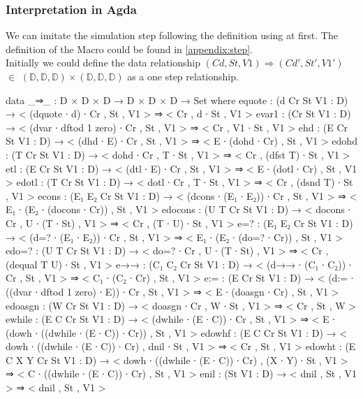 \subsubsection{Interpretation in Agda}\label{definition: agda simulation}
We can imitate the simulation step following the definition using \Agda at first.
The definition of the  Macro could be found in \ref{appendix:step}.\\
Initially we could define the data relationship $(Cd,St,V1)\Rightarrow(Cd',St',V1')$ $\in$  $(\mathds{D},\mathds{D},\mathds{D})\times (\mathds{D},\mathds{D},\mathds{D})$ as a one step relationship.
\begin{code}[fontsize=\scriptsize]
data _⇒_ : D × D × D → D × D × D → Set where
  equote  : (d Cr St V1 : D)
            → < (dquote ∙ d) ∙ Cr , St , V1 >
            ⇒ < Cr , d ∙ St , V1 >
  evar1   : (Cr St V1 : D)
            → < (dvar ∙ dftod {1} zero) ∙ Cr , St , V1 >
            ⇒ < Cr , V1 ∙ St , V1 >
  ehd     : (E Cr St V1 : D)
            → < (dhd ∙ E) ∙ Cr , St , V1 >
            ⇒ < E ∙ (dohd ∙ Cr) , St , V1 >
  edohd   : (T Cr St V1 : D)
            → < dohd ∙ Cr , T ∙ St , V1 >
            ⇒ < Cr , (dfst T) ∙ St , V1 >
  etl     : (E Cr St V1 : D)
            → < (dtl ∙ E) ∙ Cr , St , V1 >
            ⇒ < E ∙ (dotl ∙ Cr) , St , V1 >
  edotl   : (T Cr St V1 : D)
            → < dotl ∙ Cr , T ∙ St , V1 >
            ⇒ < Cr , (dsnd T) ∙ St , V1 >
  econs   : (E₁ E₂ Cr St V1 : D)
            → < (dcons ∙ (E₁ ∙ E₂)) ∙ Cr , St , V1 >
            ⇒ < E₁ ∙ (E₂ ∙ (docons ∙ Cr)) , St , V1 >
  edocons : (U T Cr St V1 : D)
            → < docons ∙ Cr , U ∙ (T ∙ St) , V1 >
            ⇒ < Cr , (T ∙ U) ∙ St , V1 >
  e=?     : (E₁ E₂ Cr St V1 : D)
            → < (d=? ∙ (E₁ ∙ E₂)) ∙ Cr , St , V1 >
            ⇒ < E₁ ∙ (E₂ ∙ (do=? ∙ Cr)) , St , V1 >
  edo=?   : (U T Cr St V1 : D)
            → < do=? ∙ Cr , U ∙ (T ∙ St) , V1 >
            ⇒ < Cr , (dequal T U) ∙ St , V1 >
  e→→     : (C₁ C₂ Cr St V1 : D)
            → < (d→→ ∙ (C₁ ∙ C₂)) ∙ Cr , St , V1 >
            ⇒ < C₁ ∙ (C₂ ∙ Cr) , St , V1 >
  e:=     : (E Cr St V1 : D)
            → < (d:= ∙ ((dvar ∙ dftod {1} zero) ∙ E)) ∙ Cr , St , V1 >
            ⇒ < E ∙ (doasgn ∙ Cr) , St , V1 >
  edoasgn : (W Cr St V1 : D)
            → < doasgn ∙ Cr , W ∙ St , V1 >
            ⇒ < Cr , St , W >
  ewhile  : (E C Cr St V1 : D)
            → < (dwhile ∙ (E ∙ C)) ∙ Cr , St , V1 >
            ⇒ < E ∙ (dowh ∙ ((dwhile ∙ (E ∙ C)) ∙ Cr)) , St , V1 >
  edowhf  : (E C Cr St V1 : D)
            → < dowh ∙ ((dwhile ∙ (E ∙ C)) ∙ Cr) , dnil ∙ St , V1 >
            ⇒ < Cr , St , V1 >
  edowht  : (E C X Y Cr St V1 : D)
            → < dowh ∙ ((dwhile ∙ (E ∙ C)) ∙ Cr) , (X ∙ Y) ∙ St , V1 >
            ⇒ <  C ∙ ((dwhile ∙ (E ∙ C)) ∙ Cr)  , St , V1 >
  enil    : (St V1 : D) → < dnil , St , V1 > ⇒ < dnil , St , V1 >
\end{code}
